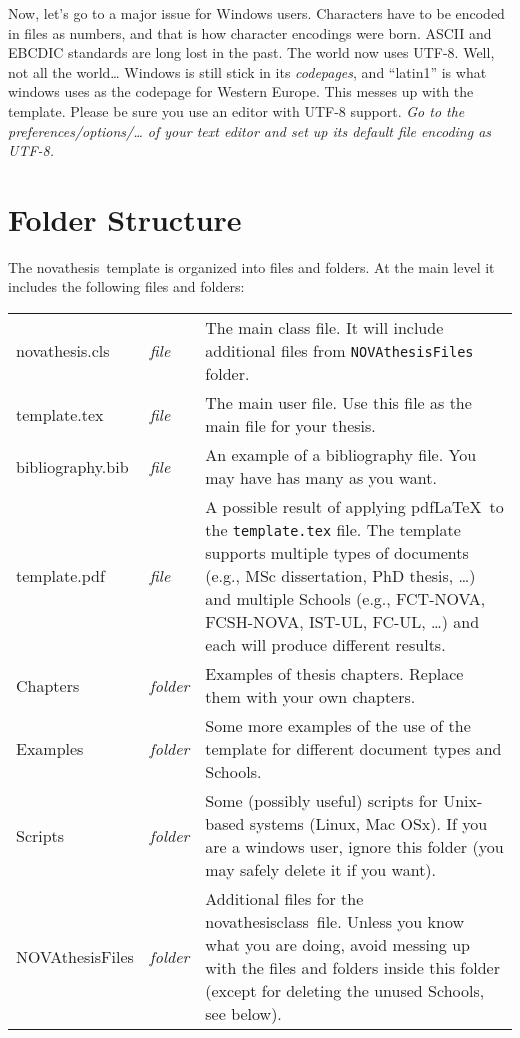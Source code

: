 Now, let's go to a major issue for Windows users.  Characters have to be encoded in files as numbers, and that is how character encodings were born. ASCII and EBCDIC standards are long lost in the past.  The world now uses UTF-8.  Well, not all the world… Windows is still stick in its \emph{codepages}, and “latin1” is what windows uses as the codepage for Western Europe. This messes up with the template. Please be sure you use an editor with UTF-8 support.  \emph{Go to the preferences/options/… of your text editor and set up its default file encoding as UTF-8.}


\section{Folder Structure} %
\label{sec:folder_structure}

The \gls{novathesis}\ template is organized into files and folders. At the main level it includes the following files and folders:

\noindent
\begin{tabularx}{\linewidth}{>{\ttfamily}l>{\itshape}l>{\upshape}X}
novathesis.cls     & file    & 
The main class file. It will include additional files from \texttt{NOVAthesisFiles} folder. 
\\ 
template.tex      & file    & 
The main user file. Use this file as the main file for your thesis. 
\\
bibliography.bib  & file    & 
An example of a bibliography file. You may have has many as you want. \\
template.pdf      & file    & 
A possible result of applying pdf\LaTeX\ to the \texttt{template.tex} file. The template supports multiple types of documents (e.g., MSc dissertation, PhD thesis, …) and multiple Schools (e.g., FCT-NOVA, FCSH-NOVA, IST-UL, FC-UL, …) and each will produce different results.
\\
Chapters          & folder  & Examples of thesis chapters. Replace them with your own chapters. 
\\
Examples          & folder  & Some more examples of the use of the template for different document types and Schools. 
\\
Scripts           & folder  & Some (possibly useful) scripts for Unix-based systems (Linux, Mac OSx). If you are a windows user, ignore this folder (you may safely delete it if you want). 
\\
NOVAthesisFiles   & folder  & 
Additional files for the \gls{novathesisclass}\ file.  Unless you know what you are doing, avoid messing up with the files and folders inside this folder (except for deleting the unused Schools, see below). 
\\
\end{tabularx}

